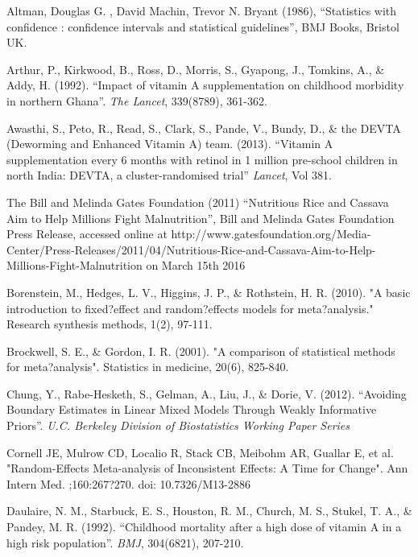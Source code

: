 \documentclass[12pt]{article}
\begin{document}
\begin{thebibliography}{99}

 Altman,  Douglas G. , David Machin, Trevor N. Bryant (1986), ``Statistics with confidence : confidence intervals and statistical guidelines'', BMJ Books, Bristol UK. 

 Arthur, P., Kirkwood, B., Ross, D., Morris, S., Gyapong, J., Tomkins, A., \& Addy, H. (1992). ``Impact of vitamin A supplementation on childhood morbidity in northern Ghana''. \emph{The Lancet}, 339(8789), 361-362.

 Awasthi, S., Peto, R., Read, S., Clark, S., Pande, V., Bundy, D., \& the DEVTA (Deworming and Enhanced Vitamin A) team. (2013). ``Vitamin A supplementation every 6 months with retinol in 1 million pre-school children in north India: DEVTA, a cluster-randomised trial'' \emph{Lancet}, Vol 381.

 The Bill and Melinda Gates Foundation (2011) ``Nutritious Rice and Cassava Aim to Help Millions Fight Malnutrition'', Bill and Melinda Gates Foundation Press Release, accessed online at http://www.gatesfoundation.org/Media-Center/Press-Releases/2011/04/Nutritious-Rice-and-Cassava-Aim-to-Help-Millions-Fight-Malnutrition on March 15th 2016 

 Borenstein, M., Hedges, L. V., Higgins, J. P., \& Rothstein, H. R. (2010). "A basic introduction to fixed?effect and random?effects models for meta?analysis." Research synthesis methods, 1(2), 97-111.

 Brockwell, S. E., \& Gordon, I. R. (2001). "A comparison of statistical methods for meta?analysis". Statistics in medicine, 20(6), 825-840.

 Chung, Y., Rabe-Hesketh, S., Gelman, A., Liu, J., \& Dorie, V. (2012). ``Avoiding Boundary Estimates in Linear Mixed Models Through Weakly Informative Priors''. \emph{U.C. Berkeley Division of Biostatistics Working Paper Series}

 Cornell JE, Mulrow CD, Localio R, Stack CB, Meibohm AR, Guallar E, et al. "Random-Effects Meta-analysis of Inconsistent Effects: A Time for Change". Ann Intern Med. ;160:267?270. doi: 10.7326/M13-2886

 Daulaire, N. M., Starbuck, E. S., Houston, R. M., Church, M. S., Stukel, T. A., \& Pandey, M. R. (1992). ``Childhood mortality after a high dose of vitamin A in a high risk population''. \emph{BMJ}, 304(6821), 207-210.


\end{thebibliography}
\end{document}
